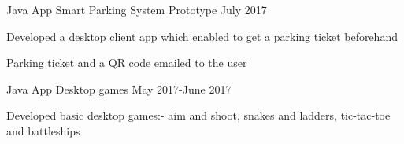 \begin{cventries}
     \cventry
    {Java App}
    {Smart Parking System Prototype}
    {}
    {July 2017}
    {
      \begin{cvitems}
        \item {Developed a desktop client app which enabled to get a parking ticket beforehand}
      \item {Parking ticket and a QR code emailed to the user }
      \end{cvitems}
    }
    \cventry
    {Java App}
    {Desktop games}
    {}
    {May 2017-June 2017}
    {
      \begin{cvitems}
      \item {Developed basic desktop games:- aim and shoot, snakes and ladders, tic-tac-toe and battleships }
      \end{cvitems}
    }
    
\end{cventries}
